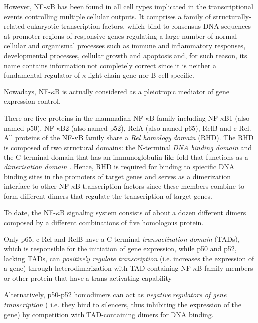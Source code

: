 \documentclass[12pt,a4paper]{report}
\begin{document}
However, NF-$\kappa$B has been found in all cell types implicated in the transcriptional events controlling multiple cellular outputs. It comprises a family of structurally-related eukaryotic transcription factors, which bind to consensus DNA sequences at promoter regions of responsive genes regulating a large number of normal cellular and organismal processes such as immune and inflammatory responses, developmental processes, cellular growth and apoptosis and, for such reason, its name contains information not completely correct since it is neither a fundamental regulator of $\kappa$ light-chain gene nor B-cell specific.

Nowadays, NF-$\kappa$B is actually considered as a pleiotropic mediator of gene expression control. 


There are five proteins in the mammalian NF-$\kappa$B family including NF-$\kappa$B1 (also named p50), NF-$\kappa$B2 (also named p52), RelA (also named p65), RelB and c-Rel. All proteins of the NF-$\kappa$B family share a \emph{Rel homology domain} (RHD). The RHD is composed of two structural domains: the N-terminal \emph{DNA binding domain} and the C-terminal domain that has an immunoglobulin-like fold that functions as a \emph{dimerisation domain} \cite{domain}. Hence, RHD is required for binding to spiecific DNA binding sites in the promoters of target genes and serves as a dimerization interface to other NF-$\kappa$B transcription factors since these members combine to form different dimers that regulate the transcription of target genes. %

To date, the NF-$\kappa$B signaling system consists of about a dozen different dimers composed by a different combinations of five homologous protein.

Only p65, c-Rel and RelB have a C-terminal \emph{transactivation domain} (TADs), which is responsible for the initiation of gene expression, while p50 and p52, lacking TADs, can \emph{positively regulate transcription} (i.e. increases the expression of a gene) through heterodimerization with TAD-containing NF-$\kappa$B family members or other protein that have a trans-activating capability.

Alternatively, p50-p52 homodimers can act as \emph{negative regulators of gene transcription} ( i.e. they bind to silencers, thus inhibiting the expression of the gene) by competition with TAD-containing dimers for DNA binding.
\end{document}
